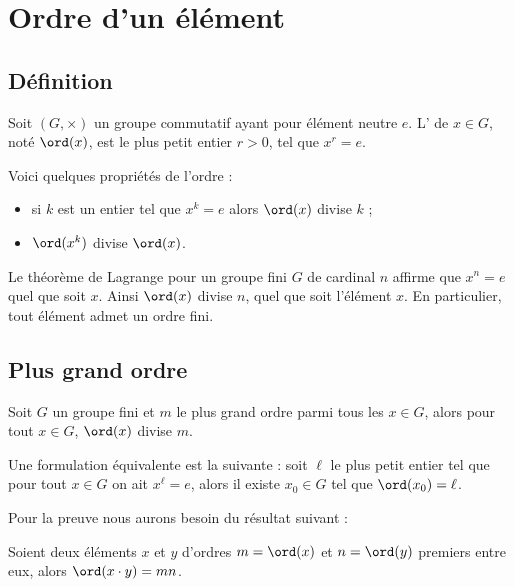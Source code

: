 \documentclass[11pt,class=report,crop=false]{standalone}
\begin{document}
\section{Ordre d'un élément}


\subsection{Définition}

Soit $(G,\times)$ un groupe commutatif ayant pour élément neutre $e$.
L' de $x \in G$, noté $\ord(x)$, est le plus petit entier $r>0$, tel que $x^r = e$.

Voici quelques propriétés de l'ordre :
\begin{itemize}
  \item si $k$ est un entier tel que $x^k = e$ alors $\ord(x)$ divise $k$ ;
  \item $\ord(x^k)$ divise $\ord(x)$.
\end{itemize}

Le théorème de Lagrange pour un groupe fini $G$ de cardinal $n$ affirme que $x^n=e$ quel que soit $x$. Ainsi $\ord(x)$ divise $n$, quel que soit l'élément $x$. En particulier, tout élément admet un ordre fini.

\subsection{Plus grand ordre}

\begin{proposition}
\label{prop:maxordre}
Soit $G$ un groupe fini et $m$ le plus grand ordre parmi tous les $x \in G$,
alors pour tout $x\in G$, $\ord(x)$ divise $m$.
\end{proposition}

Une formulation équivalente est la suivante : soit $\ell$ le plus petit entier tel que pour tout $x\in G$ on ait $x^\ell = e$, alors il existe $x_0 \in G$ tel que $\ord(x_0)=\ell$.

Pour la preuve nous aurons besoin du résultat suivant :
\begin{lemme}
\label{lem:ordre}
Soient deux éléments $x$ et $y$ d'ordres $m=\ord(x)$ et $n=\ord(y)$ premiers entre eux, alors $\ord(x\cdot y) = m n$.
\end{lemme}
\end{document}
